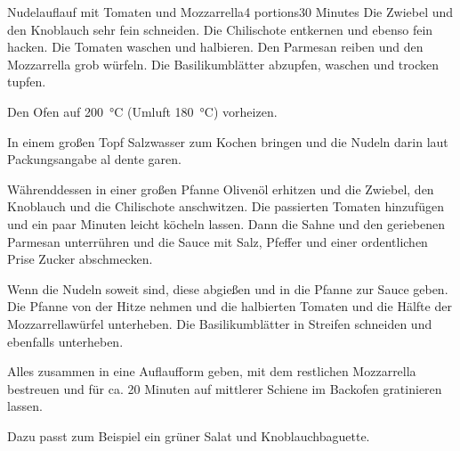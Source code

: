\documentclass[letterpaper]{article}
\begin{document}
\begin{recipe}{Nudelauflauf mit Tomaten und Mozzarrella}{4 portions}{30 Minutes}
Die Zwiebel und den Knoblauch sehr fein schneiden. Die Chilischote entkernen
und ebenso fein hacken. Die Tomaten waschen und halbieren. Den Parmesan
reiben und den Mozzarrella grob würfeln. Die Basilikumblätter abzupfen, waschen
und trocken tupfen.

Den Ofen auf \SI{200}{\celsius} (Umluft \SI{180}{\celsius}) vorheizen.

In einem großen Topf Salzwasser zum Kochen bringen und die Nudeln darin laut
Packungsangabe al dente garen.

Währenddessen in einer großen Pfanne Olivenöl erhitzen und die Zwiebel, den
Knoblauch und die Chilischote anschwitzen. Die passierten Tomaten hinzufügen
und ein paar Minuten leicht köcheln lassen. Dann die Sahne und den geriebenen
Parmesan unterrühren und die Sauce mit Salz, Pfeffer und einer ordentlichen
Prise Zucker abschmecken.

Wenn die Nudeln soweit sind, diese abgießen und in die Pfanne zur Sauce geben.
Die Pfanne von der Hitze nehmen und die halbierten Tomaten und die Hälfte
der Mozzarrellawürfel unterheben. Die Basilikumblätter in Streifen schneiden
und ebenfalls unterheben.

Alles zusammen in eine Auflaufform geben, mit dem restlichen Mozzarrella
bestreuen und für ca. 20 Minuten auf mittlerer Schiene im Backofen gratinieren
lassen.

Dazu passt zum Beispiel ein grüner Salat und Knoblauchbaguette.
\end{recipe}
\end{document}
